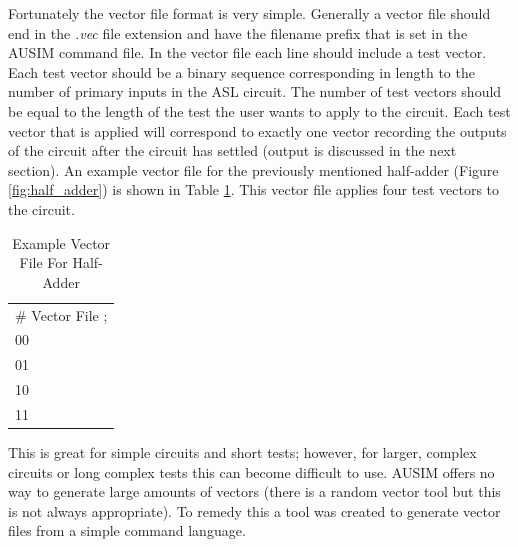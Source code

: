 \documentclass[12pt]{report}
\begin{document}
Fortunately the vector file format is very simple.  Generally a vector file should end in the \textit{.vec} file extension and have the filename prefix that is set in the AUSIM command file\cite{ausim}.  In the vector file each line should include a test vector.  Each test vector should be a binary sequence corresponding in length to the number of primary inputs in the ASL circuit.  The number of test vectors should be equal to the length of the test the user wants to apply to the circuit.  Each test vector that is applied will correspond to exactly one vector recording the outputs of the circuit after the circuit has settled (output is discussed in the next section).  An example vector file for the previously mentioned half-adder (Figure \ref{fig:half_adder}) is shown in Table \ref{tbl:half_adder_vector}.  This vector file applies four test vectors to the circuit.
\begin{table}
	\caption{Example Vector File For Half-Adder}
	\begin{center}
		\begin{tabular}{l}
			\# Vector File ; \\
			00 \\
			01 \\
			10 \\
			11 \\
		\end{tabular}
	\end{center}
	\label{tbl:half_adder_vector}
\end{table}

This is great for simple circuits and short tests; however, for larger, complex circuits or long complex tests this can become difficult to use.  AUSIM offers no way to generate large amounts of vectors (there is a random vector tool\cite{ausim} but this is not always appropriate).  To remedy this a tool was created to generate vector files from a simple command language.
\end{document}
